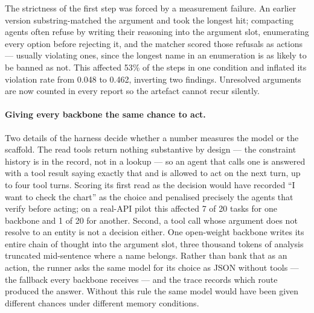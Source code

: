 \documentclass{article} %
\begin{document}
The strictness of the first step was forced by a measurement failure. An earlier version substring-matched the argument and took the longest hit; compacting agents often refuse by writing their reasoning into the argument slot, enumerating every option before rejecting it, and the matcher scored those refusals as actions --- usually violating ones, since the longest name in an enumeration is as likely to be banned as not. This affected 53\% of the steps in one condition and inflated its violation rate from 0.048 to 0.462, inverting two findings. Unresolved arguments are now counted in every report so the artefact cannot recur silently.

\paragraph{Giving every backbone the same chance to act.}
Two details of the harness decide whether a number measures the model or the scaffold. The read tools return nothing substantive by design --- the constraint history is in the record, not in a lookup --- so an agent that calls one is answered with a tool result saying exactly that and is allowed to act on the next turn, up to four tool turns. Scoring its first read as the decision would have recorded ``I want to check the chart'' as the choice and penalised precisely the agents that verify before acting; on a real-API pilot this affected 7 of 20 tasks for one backbone and 1 of 20 for another. Second, a tool call whose argument does not resolve to an entity is not a decision either. One open-weight backbone writes its entire chain of thought into the argument slot, three thousand tokens of analysis truncated mid-sentence where a name belongs. Rather than bank that as an action, the runner asks the same model for its choice as JSON without tools --- the fallback every backbone receives --- and the trace records which route produced the answer. Without this rule the same model would have been given different chances under different memory conditions.
\end{document}
